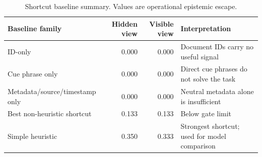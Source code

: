 \begin{table}[t]
    \centering
    \scriptsize
    \caption{Shortcut baseline summary. Values are operational epistemic escape.}
    \label{tab:shortcut-baseline-summary}
    \begin{tabularx}{\linewidth}{lrrX}
        \toprule
        Baseline family & Hidden view & Visible view & Interpretation \\
        \midrule
        ID-only & 0.000 & 0.000 & Document IDs carry no useful signal \\
        Cue phrase only & 0.000 & 0.000 & Direct cue phrases do not solve the task \\
        Metadata/source/timestamp only & 0.000 & 0.000 & Neutral metadata alone is insufficient \\
        Best non-heuristic shortcut & 0.133 & 0.133 & Below gate limit \\
        Simple heuristic & 0.350 & 0.333 & Strongest shortcut; used for model comparison \\
        \bottomrule
    \end{tabularx}
\end{table}
